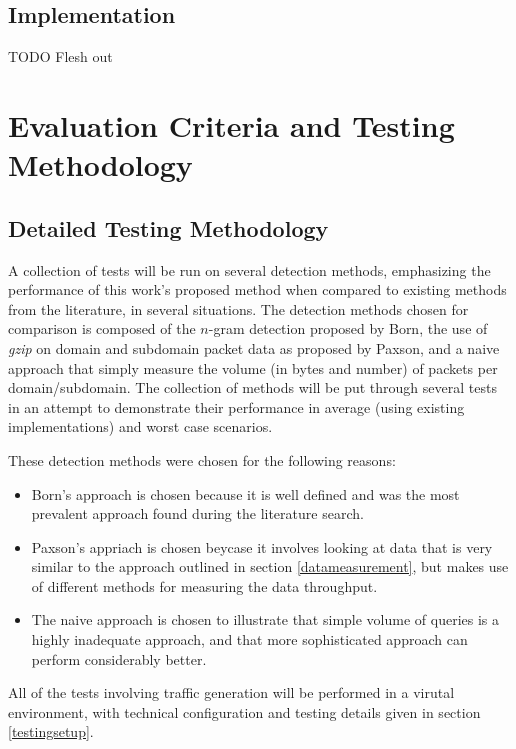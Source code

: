 \documentclass[12pt]{report}
\theoremstyle{remark}
\theoremstyle{definition}
\theoremstyle{definition}
\theoremstyle{definition}
\begin{document}
\section{Implementation}
TODO Flesh out

\chapter{Evaluation Criteria and Testing Methodology}

\section{Detailed Testing Methodology}
A collection of tests will be run on several detection methods, emphasizing the performance of this work's proposed method when compared to existing methods from the literature, in several situations. The detection methods chosen for comparison is composed of the $n$-gram detection proposed by Born\cite{Born2010.cfa}, the use of \emph{gzip} on domain and subdomain packet data as proposed by Paxson\cite{Paxson2011}, and a naive approach that simply measure the volume (in bytes and number) of packets per domain/subdomain. The collection of methods will be put through several tests in an attempt to demonstrate their performance in average (using existing implementations) and worst case scenarios.

These detection methods were chosen for the following reasons:

\begin{itemize}
\item Born's approach is chosen because it is well defined and was the most prevalent approach found during the literature search.
\item Paxson's appriach is chosen beycase it involves looking at data that is very similar to the approach outlined in section \ref{datameasurement}, but makes use of different methods for measuring the data throughput.
\item The naive approach is chosen to illustrate that simple volume of queries is a highly inadequate approach, and that more sophisticated approach can perform considerably better.
\end{itemize}

All of the tests involving traffic generation will be performed in a virutal environment, with technical configuration and testing details given in section \ref{testingsetup}.
\end{document}
